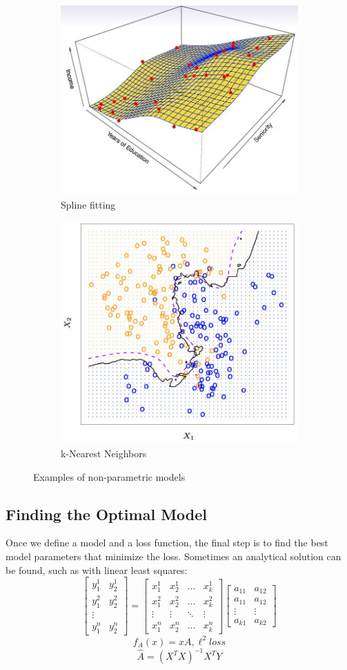 \documentclass[twoside]{article}
\begin{document}
\begin{figure}[H]
    \centering
    \begin{subfigure}{.5\textwidth}
      \centering
      \includegraphics[width=.4\linewidth]{pics/lecture_8_spline_fitting.jpg}
      \caption*{Spline fitting}
    \end{subfigure}%
    \begin{subfigure}{.5\textwidth}
      \centering
      \includegraphics[width=.4\linewidth]{pics/lecture_8_k_nearest.jpg}
      \caption*{k-Nearest Neighbors}
    \end{subfigure}
    \caption{Examples of non-parametric models}
    \label{fig:nonparametric_models}
\end{figure}

\subsection{Finding the Optimal Model}
Once we define a model and a loss function, the final step is to find the best model parameters that minimize the loss. Sometimes an analytical solution can be found, such as with linear least squares:\newline
\[
\begin{bmatrix}
    y_1^1 & y_2^1 \\
    y_1^2 & y_2^2 \\
    \vdots \\
    y_1^n & y_2^n
\end{bmatrix}
= 
\begin{bmatrix}
    x_1^1 & x_2^1 & \dots & x_k^1\\
    x_1^2 & x_2^2 & \dots & x_k^2 \\
    \vdots & \vdots & \ddots & \vdots\\
    x_1^n & x_2^n & \dots & x_k^n     
\end{bmatrix} 
\begin{bmatrix}
    a_{11} & a_{12} \\
    a_{11} & a_{12}  \\
    \vdots & \vdots \\
    a_{k1} & a_{k2}      
\end{bmatrix}
\]
$$f_A(x) = xA, \ell^2 loss$$
$$\hat{A} = (X^TX)^{-1}X^TY$$ 
\end{document}
